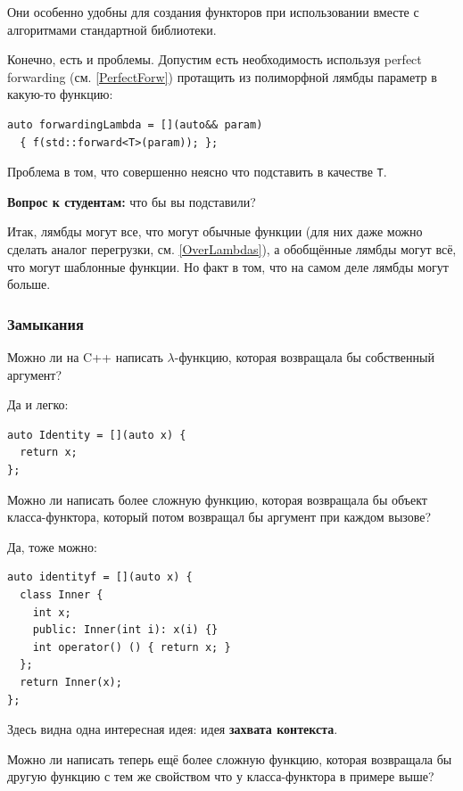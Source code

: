\documentclass[a4paper,12pt,oneside]{article}
\newif\ifanswers
\begin{document}
Они особенно удобны для создания функторов при использовании вместе с алгоритмами стандартной библиотеки.

Конечно, есть и проблемы. Допустим есть необходимость используя perfect forwarding (см. \ref{PerfectForw}) протащить из полиморфной лямбды параметр в какую-то функцию:

\begin{lstlisting}
auto forwardingLambda = [](auto&& param) 
  { f(std::forward<T>(param)); };
\end{lstlisting}

Проблема в том, что совершенно неясно что подставить в качестве \lstinline!T!.

\textbf{Вопрос к студентам:} что бы вы подставили?

\ifanswers
Правильный ответ: \lstinline!decltype(param)!
\fi

Итак, лямбды могут все, что могут обычные функции (для них даже можно сделать аналог перегрузки, см. \ref{OverLambdas}), а обобщённые лямбды могут всё, что могут шаблонные функции. Но факт в том, что на самом деле лямбды могут больше.

\subsubsection{Замыкания}\label{Closures}

Можно ли на C++ написать $\lambda$-функцию, которая возвращала бы собственный аргумент? 

Да и легко:

\begin{lstlisting}
auto Identity = [](auto x) {
  return x;
};
\end{lstlisting}

Можно ли написать более сложную функцию, которая возвращала бы объект класса-функтора, который потом возвращал бы аргумент при каждом вызове? 

Да, тоже можно:

\begin{lstlisting}
auto identityf = [](auto x) {
  class Inner {
    int x;
    public: Inner(int i): x(i) {}
    int operator() () { return x; }
  };
  return Inner(x);
};
\end{lstlisting}

Здесь видна одна интересная идея: идея \textbf{захвата контекста}. 

Можно ли написать теперь ещё более сложную функцию, которая возвращала бы другую функцию с тем же свойством что у класса-функтора в примере выше? 
\end{document}
